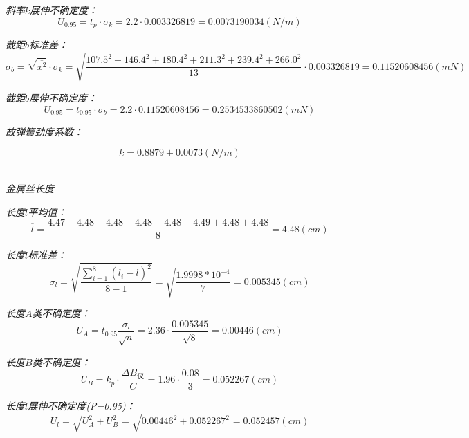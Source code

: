 \documentclass[UTF8]{ctexart}
\begin{document}
    \emph{斜率$k$展伸不确定度：}
    \begin{equation*}
        U_{0.95}=t_p·\sigma_k=2.2·0.003326819=0.0073190034(N/m)
    \end{equation*}

    \emph{截距$b$标准差：}
    \begin{equation*}
        \sigma_b=\sqrt{\overline{{x^2}}}·\sigma_k=\sqrt{\frac{107.5^2+146.4^2+180.4^2+211.3^2+239.4^2+266.0^2}{13}}·0.003326819=0.11520608456(mN)
    \end{equation*}

    \emph{截距$b$展伸不确定度：}
    \begin{equation*}
        U_{0.95}=t_{0.95}·\sigma_b=2.2·0.11520608456=0.2534533860502(mN)
    \end{equation*}

    \emph{故弹簧劲度系数：}

    \begin{equation}
        k=0.8879±0.0073 (N/m)
    \end{equation}

    \begin{center}
        \emph{\\[0.01cm]金属丝长度}
    \end{center}

        \emph{长度$l$平均值：}
        \begin{equation*}
            \overline{l}=\frac{4.47	 +4.48+	4.48+	4.48+	4.48+	4.49	+4.48	+4.48}{8} =4.48(cm)
        \end{equation*}

        \emph{长度$l$标准差：}
        \begin{equation*}
            \sigma _l=\sqrt{\frac{\sum_{i=1}^8 (l_i-\overline{l})^2}{8-1}}=\sqrt{\frac{1.9998*10^{-4}}{7}}=0.005345(cm)
        \end{equation*}

        \emph{长度$A$类不确定度：}
        \begin{equation*}
            U_A=t_{0.95}\frac{\sigma_l}{\sqrt{n}}=2.36·\frac{0.005345}{\sqrt{8}}=0.00446(cm)
        \end{equation*}

        \emph{长度$B$类不确定度：}
        \begin{equation*}
            U_{B}=k_p·\frac{\varDelta B_仪}{C}=1.96·\frac{0.08}{3}=0.052267(cm)
        \end{equation*}

        \emph{长度$l$展伸不确定度(P=0.95)：}
        \begin{equation*}
           U_{l}=\sqrt{U_A^2+U_B^2}= \sqrt{0.00446^2+0.052267^2}=0.052457(cm)
        \end{equation*}
\end{document}
